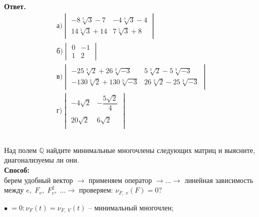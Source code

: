 		\textbf{Ответ.} 
		\begin{gather*}
			\text{а)}
				\begin{vmatrix}
					-8\sqrt[5]{3} - 7 & -4\sqrt[5]{3} - 4\\
					14\sqrt[5]{3} + 14 & 7\sqrt[5]{3} + 8
				\end{vmatrix}
			\\
			\text{б)}
				\begin{vmatrix}
					0 & -1\\
					1 & 2
				\end{vmatrix} 
			\\
			\text{в)}
				\begin{vmatrix}
					-25 \sqrt[3]{2} + 26 \sqrt[3]{-3} & 5\sqrt[3]{2} - 5\sqrt[3]{-3}\\
					-130 \sqrt[3]{2} + 130 \sqrt[3]{-3} & 26 \sqrt[3]{2} - 25\sqrt[3]{-3}
				\end{vmatrix}
			\\
			\text{г)}
				\begin{vmatrix}
					-4\sqrt{2} & -\dfrac{5 \sqrt{2}}{4}\\
					\\
					20 \sqrt{2} & 6 \sqrt{2}\\
				\end{vmatrix}
		\end{gather*}
	
		
		
		\subsection{}
		Над полем $\mathbb{Q}$ найдите минимальные многочлены следующих матриц и выясните, диагонализуемы ли они. 
		\\
		 \textbf{Способ:}\\
		берем удобный вектор $\to$ применяем оператор $\to \ldots \to$ линейная зависимость между $e, \; F_{v}, \; F_{v}^{2}, \; \ldots \to$ проверяем: $\nu_{F, \; v}(F) = 0?$ 
		
		$\bullet \; = 0: \nu_{F}(t) = \nu_{F, \; V}(t)$ -- минимальный многочлен;
		
